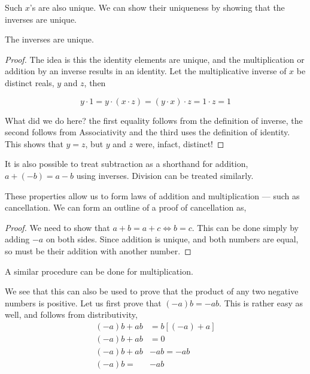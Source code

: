 Such \(x\)'s are also unique. We can show their uniqueness by showing that the inverses are unique.

\begin{proposition}
    The inverses are unique.
\end{proposition}

\begin{proof}
    The idea is this the identity elements are unique, and the multiplication or addition
    by an inverse results in an identity. Let the multiplicative inverse of \(x\) be 
    distinct reals, \(y\) and \(z\), then  

    \begin{equation*}
        y \cdot 1 = y \cdot (x \cdot z) = (y \cdot x) \cdot z = 1 \cdot z = 1
    \end{equation*}

    What did we do here? the first equality follows from the definition 
    of inverse, the second follows from Associativity and the third uses the 
    definition of identity. This shows that \(y = z\), but \(y\) and \(z\) 
    were, infact, distinct! \lightning

\end{proof}

It is also possible to treat subtraction as a shorthand for addition, \(a + (-b) = a - b\) using 
inverses. Division can be treated similarly.

These properties allow us to form laws of addition and multiplication --- such as 
cancellation. We can form an outline of a proof of cancellation as, 

\begin{proof}
    We need to show that \(a + b = a + c \iff b = c\). 
    This can be done simply by adding \(-a\) on both sides. Since addition is unique, 
    and both numbers are equal, so must be their addition with another number. 
\end{proof}

A similar procedure can be done for multiplication.

We see that this can also be used to prove that the product of any two negative numbers is 
positive. Let us first prove that \((-a)b = -ab\). This is rather easy as well, and follows 
from distributivity,
\begin{align*}
    (-a)b + ab &= b[(-a) + a] \\
    (-a)b + ab &= 0 \\
    (-a)b + ab &- ab = -ab\\
    (-a)b = &-ab
\end{align*}

